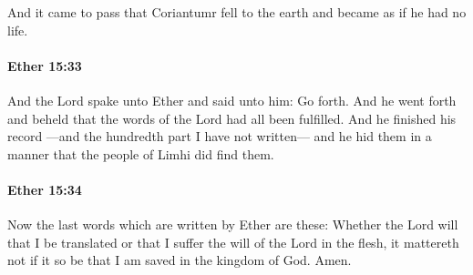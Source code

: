 			And it came to pass that Coriantumr fell to the earth
			and became as if he had no life.

		\paragraph{Ether 15:33} %
			\label{ETHER-15-33}

			And the Lord spake unto Ether
			and said unto him:
			Go forth.
			And he went forth
			and beheld that the words of the Lord had all been fulfilled.
			And he finished his record
			---and the hundredth part I have not written---
			and he hid them in a manner that the people of Limhi did find them.

		\paragraph{Ether 15:34} %
			\label{ETHER-15-34}

			Now the last words which are written by Ether are these:
			Whether the Lord will that I be translated
			or that I suffer the will of the Lord in the flesh,
			it mattereth not if it so be that I am saved in the kingdom of God.
			Amen.